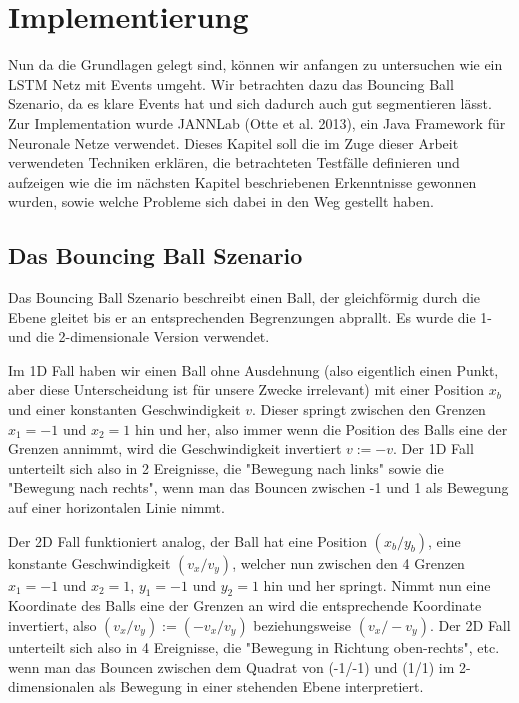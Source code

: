 \chapter{Implementierung}
Nun da die Grundlagen gelegt sind, können wir anfangen zu untersuchen wie ein LSTM Netz mit Events umgeht. Wir betrachten dazu das Bouncing Ball Szenario, da es klare Events hat und sich dadurch auch gut segmentieren lässt. Zur Implementation wurde JANNLab (Otte et al. 2013), ein Java Framework für Neuronale Netze verwendet. Dieses Kapitel soll die im Zuge dieser Arbeit verwendeten Techniken erklären, die betrachteten Testfälle definieren und aufzeigen wie die im nächsten Kapitel beschriebenen Erkenntnisse gewonnen wurden, sowie welche Probleme sich dabei in den Weg gestellt haben.

\section{Das Bouncing Ball Szenario}
Das Bouncing Ball Szenario beschreibt einen Ball, der gleichförmig durch die Ebene gleitet bis er an entsprechenden Begrenzungen abprallt. Es wurde die 1- und die 2-dimensionale Version verwendet.

Im 1D Fall haben wir einen Ball ohne Ausdehnung (also eigentlich einen Punkt, aber diese Unterscheidung ist für unsere Zwecke irrelevant) mit einer Position $ x_{b} $ und einer konstanten Geschwindigkeit $  v$. Dieser springt zwischen den Grenzen $ x_{1}=-1 $ und $ x_{2}=1 $ hin und her, also immer wenn die Position des Balls eine der Grenzen annimmt, wird die Geschwindigkeit invertiert $ v := -v $. Der 1D Fall unterteilt sich also in 2 Ereignisse, die "Bewegung nach links" sowie die "Bewegung nach rechts", wenn man das Bouncen zwischen -1 und 1 als Bewegung auf einer horizontalen Linie nimmt.

Der 2D Fall funktioniert analog, der Ball hat eine Position $ (x_{b}/y_{b}) $, eine konstante Geschwindigkeit $ (v_{x}/v_{y}) $, welcher nun zwischen den 4 Grenzen $ x_{1}=-1 $ und $ x_{2}=1 $, $ y_{1}=-1 $ und $ y_{2}=1 $ hin und her springt. Nimmt nun eine Koordinate des Balls eine der Grenzen an wird die entsprechende Koordinate invertiert, also $ (v_{x}/v_{y}) := (-v_{x}/v_{y}) $ beziehungsweise $ (v_{x}/-v_{y}) $. Der 2D Fall unterteilt sich also in 4 Ereignisse, die "Bewegung in Richtung oben-rechts", etc. wenn man das Bouncen zwischen dem Quadrat von (-1/-1) und (1/1) im 2-dimensionalen als Bewegung in einer stehenden Ebene interpretiert.

